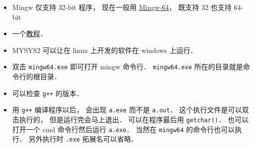 
\begin{itemize}
\item Mingw 仅支持 32-bit 程序， 现在一般用 \href{https://en.wikipedia.org/wiki/Mingw-w64}{Mingw-64}， 既支持 32 也支持 64-bit
\item 一个\href{https://www3.ntu.edu.sg/home/ehchua/programming/howto/Cygwin_HowTo.html}{教程}．
\item MYSYS2 可以让在 linux 上开发的软件在 windows 上运行．
\item 双击 \verb|mingw64.exe| 即可打开 mingw 命令行． \verb|mingw64.exe| 所在的目录就是命令行的根目录．
\item 可以检查 \verb|g++| 的版本．
\item 用 \verb|g++| 编译程序以后， 会出现 \verb|a.exe| 而不是 \verb|a.out|． 这个执行文件是可以双击执行的， 但是运行完会马上退出． 可以在程序最后用 \verb|getchar()|． 也可以打开一个 cmd 命令行然后运行 \verb|a.exe|． 当然在 \verb|mingw64| 的命令行也可以执行． 另外执行时 \verb|.exe| 拓展名可以省略．
\end{itemize}
